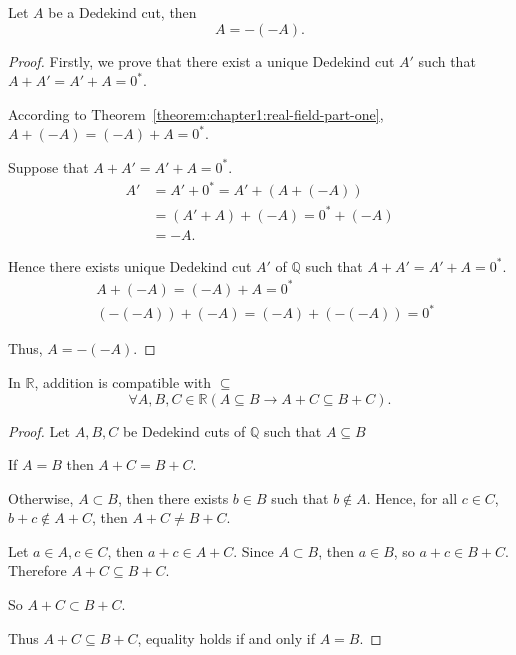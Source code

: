 \begin{theorem}\label{theorem:chapter1:negation-is-an-involution}
    Let $A$ be a Dedekind cut, then
    \[
        A = -(-A).
    \]
\end{theorem}

\begin{proof}
    Firstly, we prove that there exist a unique Dedekind cut $A'$ such that $A + A' = A' + A = {0}^{*}$.

    According to Theorem~\ref{theorem:chapter1:real-field-part-one}, $A + (-A) = (-A) + A = {0}^{*}$.

    Suppose that $A + A' = A' + A = {0}^{*}$.
    \begin{align*}
        A' & = A' + {0}^{*} = A' + (A + (-A))   \\
           & = (A' + A) + (-A) = {0}^{*} + (-A) \\
           & = -A.
    \end{align*}

    Hence there exists unique Dedekind cut $A'$ of $\mathbb{Q}$ such that $A + A' = A' + A = {0}^{*}$.
    \begin{align*}
         & A + (-A) = (-A) + A = {0}^{*}             \\
         & (-(-A)) + (-A) = (-A) + (-(-A)) = {0}^{*}
    \end{align*}

    Thus, $A = -(-A)$.
\end{proof}

\begin{theorem}
    In $\mathbb{R}$, addition is compatible with $\subseteq$
    \[
        \forall A, B, C\in\mathbb{R}(A\subseteq B \rightarrow A + C\subseteq B + C).
    \]
\end{theorem}

\begin{proof}
    Let $A, B, C$ be Dedekind cuts of $\mathbb{Q}$ such that $A\subseteq B$

    If $A = B$ then $A + C = B + C$.

    Otherwise, $A\subset B$, then there exists $b\in B$ such that $b\notin A$. Hence, for all $c\in C$, $b + c\notin A + C$, then $A + C\ne B + C$.

    Let $a\in A, c\in C$, then $a + c\in A + C$. Since $A\subset B$, then $a\in B$, so $a + c\in B + C$. Therefore $A + C\subseteq B + C$.

    So $A + C\subset B + C$.

    Thus $A + C\subseteq B + C$, equality holds if and only if $A = B$.
\end{proof}

